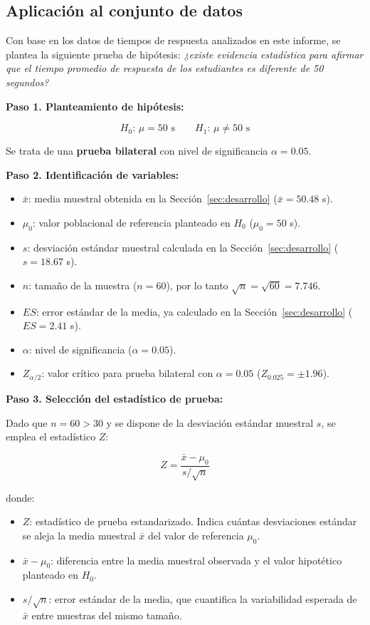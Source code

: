\documentclass[12pt,letterpaper]{article}
\begin{document}
\subsection{Aplicación al conjunto de datos}

Con base en los datos de tiempos de respuesta analizados en este informe, se plantea
la siguiente prueba de hipótesis: \textit{¿existe evidencia estadística para afirmar
que el tiempo promedio de respuesta de los estudiantes es diferente de 50 segundos?}

\textbf{Paso 1. Planteamiento de hipótesis:}

\[
H_0\text{: } \mu = 50 \text{ s} \qquad H_1\text{: } \mu \neq 50 \text{ s}
\]

Se trata de una \textbf{prueba bilateral} con nivel de significancia $\alpha = 0.05$.

\textbf{Paso 2. Identificación de variables:}

\begin{itemize}[leftmargin=1.2cm]
    \item $\bar{x}$: media muestral obtenida en la Sección~\ref{sec:desarrollo}
          ($\bar{x} = 50.48$ s).
    \item $\mu_0$: valor poblacional de referencia planteado en $H_0$
          ($\mu_0 = 50$ s).
    \item $s$: desviación estándar muestral calculada en la Sección~\ref{sec:desarrollo}
          ($s = 18.67$ s).
    \item $n$: tamaño de la muestra ($n = 60$), por lo tanto
          $\sqrt{n} = \sqrt{60} = 7.746$.
    \item $ES$: error estándar de la media, ya calculado en la
          Sección~\ref{sec:desarrollo} ($ES = 2.41$ s).
    \item $\alpha$: nivel de significancia ($\alpha = 0.05$).
    \item $Z_{\alpha/2}$: valor crítico para prueba bilateral con $\alpha = 0.05$
          ($Z_{0.025} = \pm 1.96$).
\end{itemize}

\textbf{Paso 3. Selección del estadístico de prueba:}

Dado que $n = 60 > 30$ y se dispone de la desviación estándar muestral $s$, se emplea
el estadístico $Z$:

\[
Z = \frac{\bar{x} - \mu_0}{s / \sqrt{n}}
\]

donde:
\begin{itemize}[leftmargin=1.2cm]
    \item $Z$: estadístico de prueba estandarizado. Indica cuántas desviaciones estándar
          se aleja la media muestral $\bar{x}$ del valor de referencia $\mu_0$.
    \item $\bar{x} - \mu_0$: diferencia entre la media muestral observada y el valor
          hipotético planteado en $H_0$.
    \item $s / \sqrt{n}$: error estándar de la media, que cuantifica la variabilidad
          esperada de $\bar{x}$ entre muestras del mismo tamaño.
\end{itemize}
\end{document}
